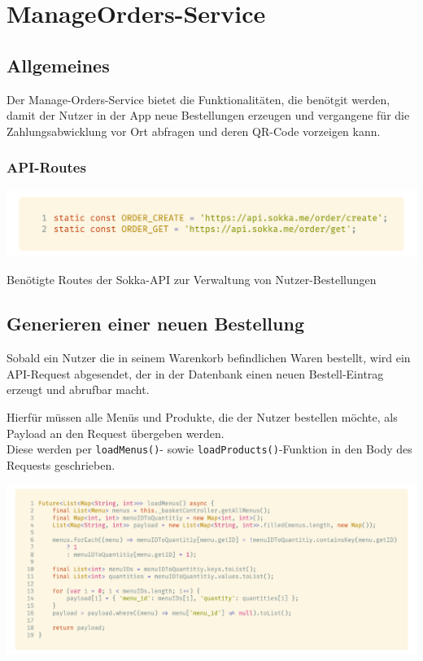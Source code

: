\section{ManageOrders-Service}

\subsection{Allgemeines}

Der Manage-Orders-Service bietet die Funktionalitäten, die benötgit werden, damit der Nutzer in der
App neue Bestellungen erzeugen und vergangene für die Zahlungsabwicklung vor Ort abfragen und
deren QR-Code vorzeigen kann.

\subsubsection{API-Routes}

\begin{code}
    \centering
    \includegraphics[width=1\textwidth]{images/Client/services/manage-orders/orderRoutes.png}
    \vspace{-25pt}
    \caption{Benötigte Routes der Sokka-API zur Verwaltung von Nutzer-Bestellungen}
\end{code}

\subsection{Generieren einer neuen Bestellung}

Sobald ein Nutzer die in seinem Warenkorb befindlichen Waren bestellt, wird ein API-Request abgesendet,
der in der Datenbank einen neuen Bestell-Eintrag erzeugt und abrufbar macht.

Hierfür müssen alle Menüs und Produkte, die der Nutzer bestellen möchte, als Payload an den
Request übergeben werden.\\
Diese werden per \lstinline{loadMenus()}- sowie \lstinline{loadProducts()}-Funktion
in den Body des Requests geschrieben.

\begin{code}
    \centering
    \includegraphics[width=1\textwidth]{images/Client/services/manage-orders/createMenuPayload.png}
    \vspace{-25pt}
    \caption{\lstinline{loadMenus()}-Funktion zum Laden bestellter Menüs in den Request-Body}
\end{code}

